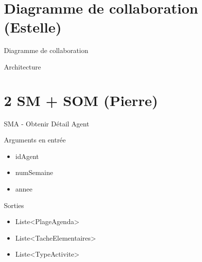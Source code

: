\documentclass[xetex]{beamer}
\begin{document}
    
    \section{Diagramme de collaboration (Estelle)}
    \begin{frame}{Diagramme de collaboration}
\noindent{}
    \end{frame}
    
    \begin{frame}{Architecture}
\noindent{}
    \end{frame}
    
\section{2 SM + SOM (Pierre)}

\begin{frame}{SMA - Obtenir Détail Agent}
\begin{small}
\noindent Arguments en entrée
\begin{itemize}
\item idAgent 
\item numSemaine 
\item annee  \\
\end{itemize}

\noindent Sorties
\begin{itemize}
\item Liste<PlageAgenda>
\item Liste<TacheElementaires>
\item Liste<TypeActivite>
\end{itemize}
\end{small}

\end{frame}
\end{document}
